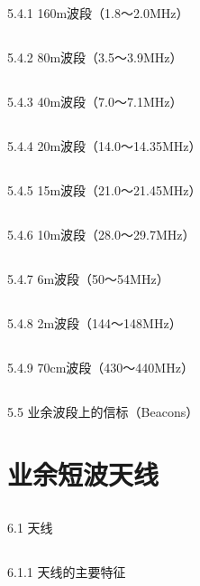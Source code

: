 \documentclass[12pt,UTF8]{ctexbook}
\begin{document}
\section{}5.4.1 160m波段（1.8～2.0MHz）
\section{}5.4.2 80m波段（3.5～3.9MHz）
\section{}5.4.3 40m波段（7.0～7.1MHz）
\section{}5.4.4 20m波段（14.0～14.35MHz）
\section{}5.4.5 15m波段（21.0～21.45MHz）
\section{}5.4.6 10m波段（28.0～29.7MHz）
\section{}5.4.7 6m波段（50～54MHz）
\section{}5.4.8 2m波段（144～148MHz）
\section{}5.4.9 70cm波段（430～440MHz）
\section{}5.5 业余波段上的信标（Beacons）

\chapter{业余短波天线}

\section{}6.1 天线
\section{}6.1.1 天线的主要特征
\end{document}
